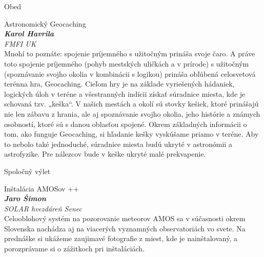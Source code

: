 \documentclass[a4paper]{report}
\begin{document}
                    \begin{tcolorbox}[
                                    colback=red!10,
                    colframe=red!50!black,
                                fonttitle=\Large\bfseries,
                title=12:30
            ]
                {\Large Obed}
                                            \end{tcolorbox}
                    \begin{tcolorbox}[
                                    colback=blue!10,
                    colframe=black!50!blue,
                                fonttitle=\Large\bfseries,
                title=14:00
            ]
                {\Large Astronomický Geocaching}
                                                            \\ \textbf{\textit{Karol Havrila}}
                                        \\ \textit{FMFI UK}                                \\[2ex]Mnohí to poznáte: spojenie príjemného s užitočným prináša svoje čaro. A práve toto spojenie príjemného (pohyb mestských uličkách a v prírode) s užitočným (spoznávanie svojho okolia v kombinácii s logikou) prináša obľúbená celosvetová terénna hra, Geocaching. Cieľom hry je na základe vyriešených hádaniek, logických úloh v teréne a všestranných indícii získať súradnice miesta, kde je schovaná tzv. „keška“. V našich mestách a okolí sú stovky kešiek, ktoré prinášajú nie len zábavu z hrania, ale aj spoznávanie svojho okolia, jeho histórie a známych osobností, ktoré sú s danou oblasťou spojené. Okrem základných informácii o tom, ako funguje Geocaching, si hľadanie kešky vyskúšame priamo v teréne. Aby to nebolo také jednoduché, súradnice miesta budú ukryté v astronómii a astrofyzike. Pre nálezcov bude v keške ukryté malé prekvapenie.
            \end{tcolorbox}
                    \begin{tcolorbox}[
                                    colback=green!10,
                    colframe=green!50!black,
                                fonttitle=\Large\bfseries,
                title=15:00
            ]
                {\Large Spoločný výlet}
                                            \end{tcolorbox}
                    \begin{tcolorbox}[
                                    colback=white,
                    colframe=black!70!white,
                                fonttitle=\Large\bfseries,
                title=17:00
            ]
                {\Large Inštalácia AMOSov ++}
                                                            \\ \textbf{\textit{Jaro Šimon}}
                                        \\ \textit{SOLAR hvezdáreň Senec}                                \\[2ex]Celooblohový systém na pozorovanie meteorov AMOS sa v súčasnosti okrem Slovenska nachádza aj na viacerých vyznamných observatoriách vo svete. Na prednáške si ukážeme zaujimavé fotografie z miest, kde je nainštalovaný, a porozprávame si o zážitkoch pri inštaláciách.
            \end{tcolorbox}
\end{document}
